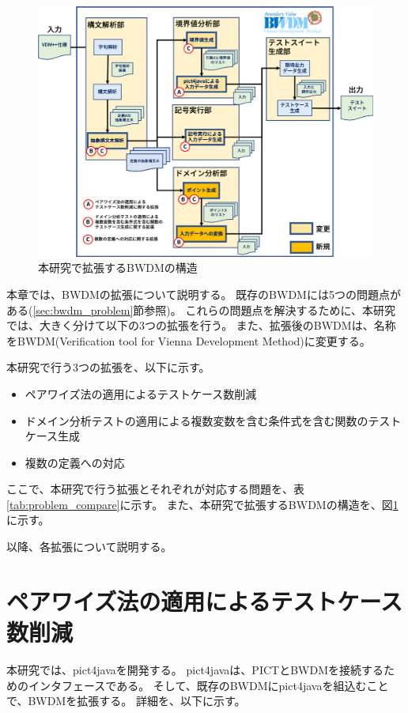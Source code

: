 \documentclass[uplatex, report, a4j, 10pt]{jsbook}
\newcommand{\tool}{BWDM}
\newcommand{\toolFullName}{Verification tool for Vienna Development Method}
\begin{document}
\begin{figure}[tp]
  \centering
  \includegraphics[keepaspectratio, width=160mm]{figs/extended_bwdm_structure}
  \caption{本研究で拡張するBWDMの構造}
  \label{fig:extendedBwdmStructure}
\end{figure}

本章では、\tool{}の拡張について説明する。
既存のBWDMには5つの問題点がある(\ref{sec:bwdm_problem}節参照)。
これらの問題点を解決するために、本研究では、大きく分けて以下の3つの拡張を行う。
また、拡張後のBWDMは、名称を\tool{}(\toolFullName{})に変更する。

本研究で行う3つの拡張を、以下に示す。
\begin{itemize}
  \item ペアワイズ法の適用によるテストケース数削減
  \item ドメイン分析テストの適用による複数変数を含む条件式を含む関数のテストケース生成
  \item 複数の定義への対応
\end{itemize}

ここで、本研究で行う拡張とそれぞれが対応する問題を、表\ref{tab:problem_compare}に示す。
また、本研究で拡張するBWDMの構造を、図\ref{fig:extendedBwdmStructure}に示す。

以降、各拡張について説明する。

\section{ペアワイズ法の適用によるテストケース数削減}\label{sec:extendPairwise}
本研究では、pict4javaを開発する\cite{hirakoba3}。
pict4javaは、PICTとBWDMを接続するためのインタフェースである。
そして、既存のBWDMにpict4javaを組込むことで、BWDMを拡張する。
詳細を、以下に示す。
\end{document}
